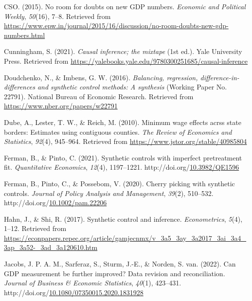 \documentclass[12pt,nobind, a4paper]{reedthesis}
\newlength{\cslhangindent}
\newenvironment{CSLReferences}[2] %
{%
	\setlength{\parindent}{0pt}
	\ifodd #1 \everypar{\setlength{\hangindent}{\cslhangindent}}\ignorespaces\fi
	\ifnum #2 > 0
	\setlength{\parskip}{#2\baselineskip}
	\fi
}%
{}
\begin{document}
\begin{CSLReferences}{1}{0}
 \leavevmode{}%
 CSO. (2015). No room for doubts on new {GDP} numbers. \emph{Economic and Political Weekly}, \emph{50}(16), 7--8. Retrieved from \url{https://www.epw.in/journal/2015/16/discussion/no-room-doubts-new-gdp-numbers.html}

 \leavevmode{}%
 Cunningham, S. (2021). \emph{Causal inference; the mixtape} (1st ed.). Yale University Press. Retrieved from \url{https://yalebooks.yale.edu/9780300251685/causal-inference}

 \leavevmode{}%
 Doudchenko, N., \& Imbens, G. W. (2016). \emph{Balancing, regression, difference-in-differences and synthetic control methods: A synthesis} (Working Paper No. 22791). National Bureau of Economic Research. Retrieved from \url{https://www.nber.org/papers/w22791}

 \leavevmode{}%
 Dube, A., Lester, T. W., \& Reich, M. (2010). Minimum wage effects acrss state borders: Estimates using contiguous counties. \emph{The Review of Economics and Statistics}, \emph{92}(4), 945--964. Retrieved from \url{https://www.jstor.org/stable/40985804}

 \leavevmode{}%
 Ferman, B., \& Pinto, C. (2021). Synthetic controls with imperfect pretreatment fit. \emph{Quantitative Economics}, \emph{12}(4), 1197--1221. http://doi.org/\href{https://doi.org/10.3982/QE1596}{10.3982/QE1596}

 \leavevmode{}%
 Ferman, B., Pinto, C., \& Possebom, V. (2020). Cherry picking with synthetic controls. \emph{Journal of Policy Analysis and Management}, \emph{39}(2), 510--532. http://doi.org/\href{https://doi.org/10.1002/pam.22206}{10.1002/pam.22206}

 \leavevmode{}%
 Hahn, J., \& Shi, R. (2017). Synthetic control and inference. \emph{Econometrics}, \emph{5}(4), 1--12. Retrieved from \url{https://econpapers.repec.org/article/gamjecnmx/v_3a5_3ay_3a2017_3ai_3a4_3ap_3a52-_3ad_3a120610.htm}

 \leavevmode{}%
 Jacobs, J. P. A. M., Sarferaz, S., Sturm, J.-E., \& Norden, S. van. (2022). Can {GDP} measurement be further improved? Data revision and reconciliation. \emph{Journal of Business \& Economic Statistics}, \emph{40}(1), 423--431. http://doi.org/\href{https://doi.org/10.1080/07350015.2020.1831928}{10.1080/07350015.2020.1831928}


\end{CSLReferences}
\end{document}

